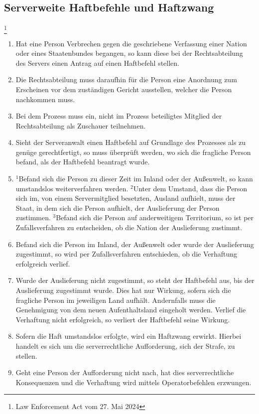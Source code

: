 \documentclass{article}
\begin{document}
\subsection{Serverweite Haftbefehle und Haftzwang}\footnote{Law Enforcement Act vom 27. Mai 2024}
\begin{enumerate}[(1)]
	\item Hat eine Person Verbrechen gegen die geschriebene Verfassung einer Nation oder eines Staatenbundes begangen, so kann diese bei der Rechtsabteilung des Servers einen Antrag
	auf einen Haftbefehl stellen.
	\item Die Rechtsabteilung muss daraufhin für die Person eine Anordnung zum Erscheinen vor dem zuständigen Gericht ausstellen, welcher die Person nachkommen muss.
	\item Bei dem Prozess muss ein, nicht im Prozess beteiligtes Mitglied der Rechtsabteilung als Zuschauer teilnehmen.
	\item Sieht der Serveranwalt einen Haftbefehl auf Grundlage des Prozesses als zu genüge gerechtfertigt, so muss überprüft werden, wo sich die fragliche Person befand, als der Haftbefehl beantragt wurde.
	\item $^{1}$Befand sich die Person zu dieser Zeit im Inland oder der Außenwelt, so kann umstandslos weiterverfahren werden. $^{2}$Unter dem Umstand, dass die Person sich im, von einem Servermitglied besetzten,
	Ausland aufhielt, muss der Staat, in dem sich die Person aufhielt, der Auslieferung der Person zustimmen. $^{3}$Befand sich die Person auf anderweitigem Territorium, so ist per Zufallsverfahren zu entscheiden, ob die Nation der Auslieferung zustimmt.
	\item Befand sich die Person im Inland, der Außenwelt oder wurde der Auslieferung zugestimmt, so wird per Zufallsverfahren entschieden, ob die Verhaftung erfolgreich verlief.
	\item Wurde der Auslieferung nicht zugestimmt, so steht der Haftbefehl aus, bis der Auslieferung zugestimmt wurde. Dies hat nur Wirkung, sofern sich die fragliche Person im jeweiligen Land aufhält. Andernfalls muss die Genehmigung von dem neuen Aufenthaltsland eingeholt werden. Verlief die Verhaftung nicht erfolgreich, so verliert der Haftbefehl seine Wirkung.
	\item Sofern die Haft umstandslos erfolgte, wird ein Haftzwang erwirkt. Hierbei handelt es sich um die serverrechtliche Aufforderung, sich der Strafe, zu stellen.
	\item Geht eine Person der Aufforderung nicht nach, hat dies serverrechtliche Konsequenzen und die Verhaftung wird mittels Operatorbefehlen erzwungen.
\end{enumerate}
\end{document}

